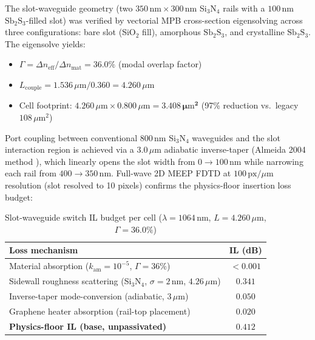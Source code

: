 \documentclass[journal]{IEEEtran}
\begin{document}
The slot-waveguide geometry (two $350\,\mathrm{nm} \times 300\,\mathrm{nm}$ Si$_3$N$_4$ rails with a $100\,\mathrm{nm}$ $\mathrm{Sb_2S_3}$-filled slot) was verified by vectorial MPB cross-section eigensolving across three configurations: bare slot (SiO$_2$ fill), amorphous $\mathrm{Sb_2S_3}$, and crystalline $\mathrm{Sb_2S_3}$. The eigensolve yields:
\begin{itemize}
    \item $\Gamma = \Delta n_\mathrm{eff} / \Delta n_\mathrm{mat} = 36.0\%$ (modal overlap factor)
    \item $L_\mathrm{couple} = 1.536\,\mu\mathrm{m} / 0.360 = 4.260\,\mu\mathrm{m}$
    \item Cell footprint: $4.260\,\mu\mathrm{m} \times 0.800\,\mu\mathrm{m} = \mathbf{3.408\,\mu\mathrm{m}^2}$ (97\% reduction vs.\ legacy $108\,\mu\mathrm{m}^2$)
\end{itemize}

Port coupling between conventional $800\,\mathrm{nm}$ Si$_3$N$_4$ waveguides and the slot interaction region is achieved via a $3.0\,\mu\mathrm{m}$ adiabatic inverse-taper (Almeida 2004 method \cite{Almeida2004}), which linearly opens the slot width from $0 \to 100\,\mathrm{nm}$ while narrowing each rail from $400 \to 350\,\mathrm{nm}$. Full-wave 2D MEEP FDTD at $100\,\mathrm{px}/\mu\mathrm{m}$ resolution (slot resolved to 10 pixels) confirms the physics-floor insertion loss budget:

\begin{table}[!htbp]
\centering
\caption{Slot-waveguide switch IL budget per cell ($\lambda = 1064\,\mathrm{nm}$, $L = 4.260\,\mu\mathrm{m}$, $\Gamma = 36.0\%$)}
\label{tab:slot_switch_il}
\begin{tabular}{lc}
\hline
\textbf{Loss mechanism} & \textbf{IL (dB)} \\
\hline
Material absorption ($k_\mathrm{am} = 10^{-5}$, $\Gamma = 36\%$) & $<0.001$ \\
Sidewall roughness scattering (Si$_3$N$_4$, $\sigma = 2\,\mathrm{nm}$, $4.26\,\mu\mathrm{m}$) & $0.341$ \\
Inverse-taper mode-conversion (adiabatic, $3\,\mu\mathrm{m}$) & $0.050$ \\
Graphene heater absorption (rail-top placement) & $0.020$ \\
\hline
\textbf{Physics-floor IL (base, unpassivated)} & $\mathbf{0.412}$ \\
\hline
\end{tabular}
\end{table}
\end{document}
